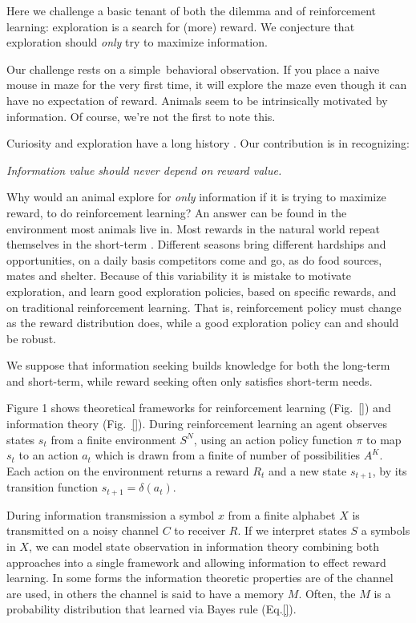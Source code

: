 \documentclass[9pt,twocolumn,twoside]{pnas-new}
\begin{document}
Here we challenge a basic tenant of both the dilemma and of reinforcement learning: exploration is a search for (more) reward. We conjecture that exploration should \textit{only} try to maximize information.

Our challenge rests on a simple behavioral observation. If you place a naive mouse in maze for the very first time, it will explore the maze even though it can have no expectation of reward. Animals seem to be intrinsically motivated by information. Of course, we're not the first to note this.

Curiosity and exploration have a long history \cite{}. Our contribution is in recognizing:

\textit{Information value should never depend on reward value.}

Why would an animal explore for \textit{only} information if it is trying to maximize reward, to do reinforcement learning? An answer can be found in the environment most animals live in. Most rewards in the natural world repeat themselves in the short-term \cite{}. Different seasons bring different hardships and opportunities, on a daily basis competitors come and go, as do food sources, mates and shelter. Because of this variability it is mistake to motivate exploration, and learn good exploration policies, based on specific rewards, and on traditional reinforcement learning. That is, reinforcement policy must change as the reward distribution does, while a good exploration policy can and should be robust. 

We suppose that information seeking builds knowledge for both the long-term and short-term, while reward seeking often only satisfies short-term needs. 

Figure 1 shows theoretical frameworks for reinforcement learning (Fig.~\ref{}) and information theory (Fig.~\ref{}). During reinforcement learning an agent observes states $s_t$ from a finite environment $S^N$, using an action policy function $\pi$ to map $s_t$ to an action $a_t$ which is drawn from a finite of number of possibilities $A^K$. Each action on the environment returns a reward $R_t$ and a new state $s_{t+1}$, by its transition function $s_{t+1} = \delta(a_t)$.  

During information transmission a symbol $x$ from a finite alphabet $X$ is transmitted on a noisy channel $C$ to receiver $R$. If we interpret states $S$ a symbols in $X$, we can model state observation in information theory combining both approaches into a single framework and allowing information to effect reward learning. In some forms the information theoretic properties are of the channel are used, in others the channel is said to have a memory $M$. Often, the $M$ is a probability distribution that learned via Bayes rule (Eq.\ref{}).  
\end{document}

